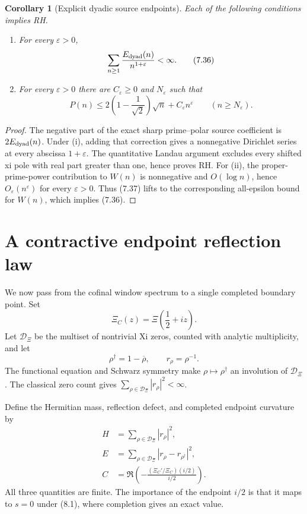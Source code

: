 \documentclass[11pt]{article}
\newtheorem{corollary}[theorem]{Corollary}
\newcommand{\XiR}{\Xi}
\begin{document}
\begin{corollary}[Explicit dyadic source endpoints]
\label{cor:explicit-source-endpoints}
Each of the following conditions implies RH.
\begin{enumerate}[label=\textup{(\roman*)}]
\item For every $\varepsilon>0$,
\[
 \sum_{n\ge1}\frac{E_{\rm dyad}(n)}{n^{1+\varepsilon}}<\infty.
 \tag{7.36}
\]
\item For every $\varepsilon>0$ there are $C_\varepsilon\ge0$ and $N_\varepsilon$ such that
\[
 P(n)\le2\left(1-\frac1{\sqrt2}\right)\sqrt n
       +C_\varepsilon n^\varepsilon
 \qquad(n\ge N_\varepsilon).
 \tag{7.37}
\]
\end{enumerate}
\end{corollary}

\begin{proof}
The negative part of the exact sharp prime--polar source coefficient is $2E_{\rm dyad}(n)$.  Under (i),
adding that correction gives a nonnegative Dirichlet series at every abscissa
$1+\varepsilon$.  The quantitative Landau argument excludes every shifted xi pole with real
part greater than one, hence proves RH.  For (ii), the proper-prime-power contribution to $W(n)$
is nonnegative and $O(\log n)$, hence $O_\varepsilon(n^\varepsilon)$ for every
$\varepsilon>0$.  Thus (7.37) lifts to the corresponding all-epsilon bound for $W(n)$, which
implies (7.36).
\end{proof}

\section{A contractive endpoint reflection law}
\label{sec:endpoint-reflection}

We now pass from the cofinal window spectrum to a single completed boundary point.  Set
\[
 \Xi_C(z)=\XiR\!\left(\frac12+iz\right).
 \tag{8.1}
\]
Let $\mathcal D_\Xi$ be the multiset of nontrivial Xi zeros, counted with analytic multiplicity,
and let
\[
 \rho^\dagger=1-\overline\rho,\qquad r_\rho=\rho^{-1}.
 \tag{8.2}
\]
The functional equation and Schwarz symmetry make $\rho\mapsto\rho^\dagger$ an involution of
$\mathcal D_\Xi$.  The classical zero count gives
$\sum_{\rho\in\mathcal D_\Xi}|r_\rho|^2<\infty$.

Define the Hermitian mass, reflection defect, and completed endpoint curvature by
\[
 \begin{aligned}
 H&=\sum_{\rho\in\mathcal D_\Xi}|r_\rho|^2,\\
 E&=\sum_{\rho\in\mathcal D_\Xi}
       |r_\rho-r_{\rho^\dagger}|^2,\\
 C&=\Re\!\left(-\frac{(\Xi_C'/\Xi_C)(i/2)}{i/2}\right).
 \end{aligned}
 \tag{8.3}
\]
All three quantities are finite.  The importance of the endpoint $i/2$ is that it maps to
$s=0$ under \textup{(8.1)}, where completion gives an exact value.
\end{document}
